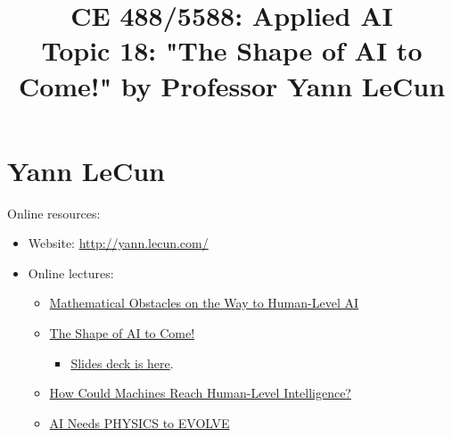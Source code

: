 \documentclass[12pt]{article}
\begin{document}
\doublespacing	

\title{CE 488/5588: Applied AI \\ \large Topic 18: "The Shape of AI to Come!" by Professor Yann LeCun}
\author{}
\date{}
\maketitle

\section*{Yann LeCun}

Online resources:
\begin{itemize}
    \item Website: \href{http://yann.lecun.com/}{http://yann.lecun.com/}
    \item Online lectures:
    \begin{itemize}
        \item \href{https://www.youtube.com/watch?v=ETZfkkv6V7Y&ab_channel=JointMathematicsMeetings}{Mathematical Obstacles on the Way to Human-Level AI}
        \item \href{https://www.youtube.com/live/m3H2q6MXAzs}{The Shape of AI to Come!} 
        \begin{itemize}
        \item \href{https://drive.google.com/file/d/1j3A8SYtkJqui7CotCMuvES2LpR17JYrQ/view?pli=1}{Slides deck is here}.
    \end{itemize}
        \item \href{https://www.youtube.com/watch?v=xL6Y0dpXEwc&ab_channel=ColumbiaEngineering}{How Could Machines Reach Human-Level Intelligence?}
        \item \href{https://www.youtube.com/watch?v=RUnFgu8kH-4&ab_channel=ThisIsWorld}{AI Needs PHYSICS to EVOLVE }
    \end{itemize}
\end{itemize}
\end{document}
